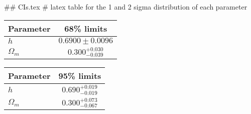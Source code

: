 ## CIs.tex
# latex table for the 1 and 2 sigma distribution of each parameter

\begin{tabular} { l  c}
 Parameter &  68\% limits\\
\hline
{\boldmath$h              $} & $0.6900\pm 0.0096          $\\
{\boldmath$\Omega_m       $} & $0.300^{+0.030}_{-0.039}   $\\
\hline
\end{tabular}

\begin{tabular} { l  c}
 Parameter &  95\% limits\\
\hline
{\boldmath$h              $} & $0.690^{+0.019}_{-0.019}   $\\
{\boldmath$\Omega_m       $} & $0.300^{+0.073}_{-0.067}   $\\
\hline
\end{tabular}
